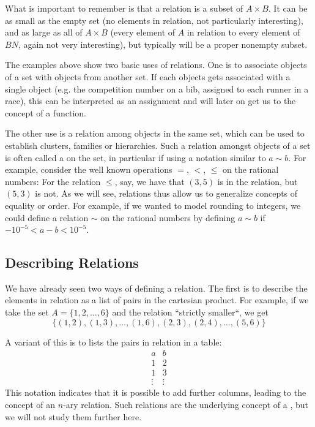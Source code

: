 What is important to remember is that a relation is a subset of $A\times B$.
It can be as small as the empty set (no elements in relation, not
particularly interesting), and as large as all of $A\times B$ (every element
of $A$ in relation to every element of $BN$, again not very interesting),
but typically will be a proper nonempty subset.
\medskip

The examples above show two basic uses of relations. One is to associate objects
of a set with objects from another set. If each objects gets associated with
a single object (e.g. the competition number on a bib, assigned to each runner
in a race), this can be interpreted as an assignment and will later on get
us to the concept of a function.

The other use is a relation among objects in the same set, which can be used
to establish clusters, families or hierarchies. Such a relation amongst
objects of a set is often called a  on the set, in
particular if using a notation similar to $a\sim b$.  For example, consider
the well known operations $=$, $<$, $\le$ on the rational numbers: For the
relation $\le$, say, we have that $(3,5)$ is in the relation, but $(5,3)$ is
not. As we will see, relations thus allow us to generalize concepts of
equality or order. For example, if we wanted to model rounding to integers,
we could define a relation $\sim$ on the rational numbers by
defining $a\sim b$ if $-10^{-5}<a-b<10^{-5}$.

\subsection{Describing Relations}
\label{descrel}

We have already seen two ways of defining a relation. The first is to
describe the elements in relation as a list of pairs in the cartesian
product. For example, if we take the set $A=\{1,2,\ldots,6\}$ and the
relation ``strictly smaller``, we get
\[
\{(1,2),(1,3),\ldots,(1,6),(2,3),(2,4),\ldots,(5,6) \}
\]

A variant of this is to lists the pairs in relation in a table:
\[
\begin{array}{c|c}
a&b\\
\hline
1&2\\
1&3\\
\vdots&\vdots
\end{array}
\]
This notation indicates that it is possible to add further columns, leading
to the concept of an $n$-ary relation. Such relations are the underlying
concept of a , but we will not study them
further here.
\smallskip

